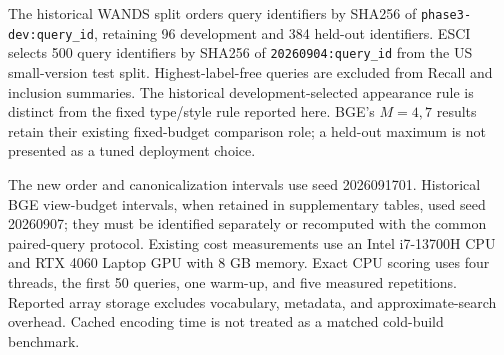 


The historical WANDS split orders query identifiers by SHA256 of
\texttt{phase3-dev:query\_id}, retaining 96 development and 384 held-out identifiers.
ESCI selects 500 query identifiers by SHA256 of \texttt{20260904:query\_id} from
the US small-version test split. Highest-label-free queries are excluded from
Recall and inclusion summaries. The historical development-selected appearance
rule is distinct from the fixed type/style rule reported here. BGE's $M=4,7$
results retain their existing fixed-budget comparison role; a held-out maximum
is not presented as a tuned deployment choice.

The new order and canonicalization intervals use seed 2026091701. Historical
BGE view-budget intervals, when retained in supplementary tables, used seed
20260907; they must be identified separately or recomputed with the common
paired-query protocol. Existing cost measurements use an Intel i7-13700H CPU
and RTX 4060 Laptop GPU with 8 GB memory. Exact CPU scoring uses four threads,
the first 50 queries, one warm-up, and five measured repetitions. Reported array
storage excludes vocabulary, metadata, and approximate-search overhead.
Cached encoding time is not treated as a matched cold-build benchmark.
